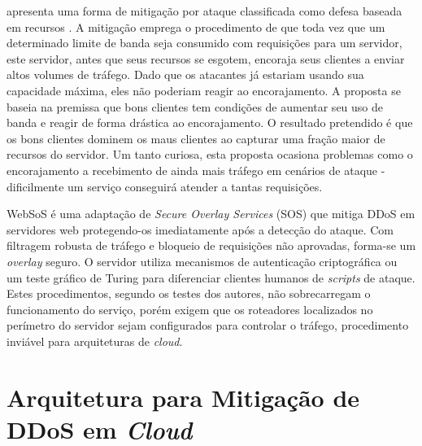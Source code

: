 \documentclass[a4paper, 12pt]{article}
\begin{document}
\cite{Walfish:2010:DDO:1731060.1731063} apresenta uma forma de mitigação por ataque classificada como defesa baseada em recursos \cite{Dwork:1992:PVP:646757.705669}. A mitigação emprega o procedimento de que toda vez que um determinado limite de banda seja consumido com requisições para um servidor, este servidor, antes que seus recursos se esgotem, encoraja seus clientes a enviar altos volumes de tráfego. Dado que os atacantes já estariam usando sua capacidade máxima, eles não poderiam reagir ao encorajamento. A proposta se baseia na premissa que bons clientes tem condições de aumentar seu uso de banda e reagir de forma drástica ao encorajamento. O resultado pretendido é que os bons clientes dominem os maus clientes ao capturar uma fração maior de recursos do servidor. Um tanto curiosa, esta proposta ocasiona problemas como %
o encorajamento a recebimento de ainda mais tráfego em cenários de ataque - 
dificilmente um serviço conseguirá atender a tantas requisições.
%
%


WebSoS \cite{Stavrou:2005:WOS:1090583.1648614} é uma adaptação de \emph{Secure Overlay Services} (SOS) \cite{Keromytis:2002:SSO:964725.633032} que mitiga DDoS em servidores web protegendo-os imediatamente após a detecção do ataque. Com filtragem robusta de tráfego e bloqueio de requisições não aprovadas, forma-se um \emph{overlay} seguro. O servidor utiliza mecanismos de autenticação criptográfica ou um teste gráfico de Turing \cite{Dietrich00analyzingdistributed} para diferenciar clientes humanos de \emph{scripts} de ataque. Estes procedimentos, segundo os testes dos autores, não sobrecarregam o funcionamento do serviço, porém exigem que os roteadores localizados no perímetro do servidor sejam configurados para controlar o tráfego, procedimento inviável para arquiteturas de \emph{cloud}.
 



\section{Arquitetura para Mitigação de DDoS em \emph{Cloud}}
\end{document}
